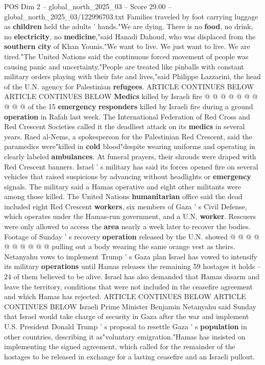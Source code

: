 \begin{textsample}{POS Dim 2 – global\_north\_2025\_03 – Score 29.00 – global\_north\_2025\_03/122996703.txt}
Families traveled by foot carrying luggage as \textbf{children} held the adults ' hands."We are dying.
There is no \textbf{food}, no drink, no \textbf{electricity}, no \textbf{medicine},"said Hanadi Dahoud, who was displaced from the \textbf{southern} \textbf{city} of Khan Younis."We want to live.
We just want to live.
We are tired."The United Nations said the continuous forced movement of people was causing panic and uncertainty."People are treated like pinballs with constant military orders playing with their fate and lives,"said Philippe Lazzarini, the head of the U.N. agency for Palestinian \textbf{refugees}.
ARTICLE CONTINUES BELOW ARTICLE CONTINUES BELOW \textbf{Medics} killed by Israeli fire @ @ @ @ @ @ @ @ @ @ of the 15 \textbf{emergency} \textbf{responders} killed by Israeli fire during a ground \textbf{operation} in Rafah last week.
The International Federation of Red Cross and Red Crescent Societies called it the deadliest attack on its \textbf{medics} in several years.
Raed al-Nems, a spokesperson for the Palestinian Red Crescent, said the paramedics were"killed in \textbf{cold} blood"despite wearing uniforms and operating in clearly labeled \textbf{ambulances}.
At funeral prayers, their shrouds were draped with Red Crescent banners.
Israel ' s military has said its forces opened fire on several vehicles that raised suspicions by advancing without headlights or \textbf{emergency} signals.
The military said a Hamas operative and eight other militants were among those killed.
The United Nations \textbf{humanitarian} office said the dead included eight Red Crescent \textbf{workers}, six members of Gaza ' s Civil Defense, which operates under the Hamas-run government, and a U.N. \textbf{worker}.
Rescuers were only allowed to access the \textbf{area} nearly a week later to recover the bodies.
Footage of Sunday ' s recovery \textbf{operation} released by the U.N. showed @ @ @ @ @ @ @ @ @ @ pulling out a body wearing the same orange vest as theirs.
Netanyahu vows to implement Trump ' s Gaza plan Israel has vowed to intensify its military \textbf{operations} until Hamas releases the remaining 59 hostages it holds -- 24 of them believed to be alive.
Israel has also demanded that Hamas disarm and leave the territory, conditions that were not included in the ceasefire agreement and which Hamas has rejected.
ARTICLE CONTINUES BELOW ARTICLE CONTINUES BELOW Israeli Prime Minister Benjamin Netanyahu said Sunday that Israel would take charge of security in Gaza after the war and implement U.S.
President Donald Trump ' s proposal to resettle Gaza ' s \textbf{population} in other countries, describing it as"voluntary emigration."Hamas has insisted on implementing the signed agreement, which called for the remainder of the hostages to be released in exchange for a lasting ceasefire and an Israeli pullout.

\end{textsample}
